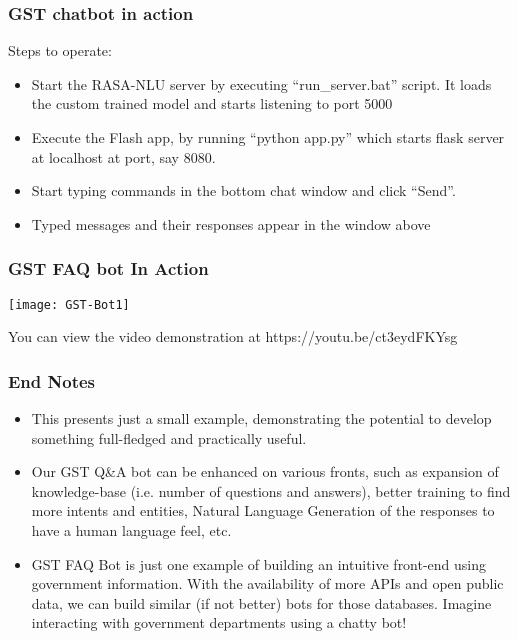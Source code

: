  \begin{frame}[fragile]\frametitle{GST chatbot in action}
 Steps to operate:
\begin{itemize}
\item Start the RASA-NLU server by executing ``run\_server.bat'' script. It loads the custom trained model and starts listening to port 5000
\item Execute the Flash app, by running ``python app.py'' which starts flask server at localhost at port, say 8080.
\item Start typing commands in the bottom chat window and click ``Send''.
\item Typed messages and their responses appear in the window above
\end{itemize}
\end{frame}

 \begin{frame}[fragile]\frametitle{GST FAQ bot In Action}
\begin{center}
\texttt{[image: GST-Bot1]}
\end{center}
You can view the video demonstration at https://youtu.be/ct3eydFKYsg
\end{frame}


 \begin{frame}[fragile]\frametitle{End Notes}
\begin{itemize}
\item This presents just a small example, demonstrating the potential to develop something full-fledged and practically useful.
\item Our GST Q\&A bot can be enhanced on various fronts, such as expansion of knowledge-base (i.e. number of questions and answers), better training to find more intents and entities, Natural Language Generation of the responses to have a human language feel, etc.
\item GST FAQ Bot is just one example of building an intuitive front-end using government information. With the availability of more APIs and open public data, we can build similar (if not better) bots for those databases. Imagine interacting with government departments using a chatty bot!
\end{itemize}
\end{frame}